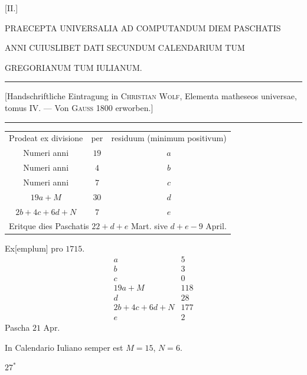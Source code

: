 \clearpage\begingroup
{}\NoSourceHead
\begin{center}
[II.]\par\medskip
\large PRAECEPTA UNIVERSALIA AD COMPUTANDUM DIEM PASCHATIS\par
ANNI CUIUSLIBET DATI SECUNDUM CALENDARIUM TUM\par
GREGORIANUM TUM IULIANUM.
\end{center}
\noindent\rule{\textwidth}{0.4pt}
\begin{center}\small
[Handschriftliche Eintragung in \textsc{Christian Wolf}, Elementa matheseos universae, tomus IV. --- Von \textsc{Gauss} 1800 erworben.]
\end{center}
\noindent\rule{\textwidth}{0.4pt}
\begin{center}
\setlength{\tabcolsep}{5pt}\renewcommand{\arraystretch}{1.3}
\begin{tabular}{|c|c|c|}\hline
Prodeat ex divisione & per & residuum (minimum positivum)\\
Numeri anni & $19$ & $a$\\
Numeri anni & $4$ & $b$\\
Numeri anni & $7$ & $c$\\
$19a+M$ & $30$ & $d$\\
$2b+4c+6d+N$ & $7$ & $e$\\\hline
\multicolumn{3}{|c|}{Eritque dies Paschatis $22+d+e$ Mart. sive $d+e-9$ April.}\\\hline
\end{tabular}
\end{center}
\begin{center}
Ex[emplum] pro $1715$.
\[
\begin{array}{rc}
a&5\\
b&3\\
c&0\\
19a+M&118\\
d&28\\
2b+4c+6d+N&177\\
e&2
\end{array}
\]
Pascha $21$ Apr.
\end{center}
\noindent\hspace*{\parindent}In Calendario Iuliano semper est $M=15$, $N=6$.
\begin{flushright}$27^{\ast}$\end{flushright}

